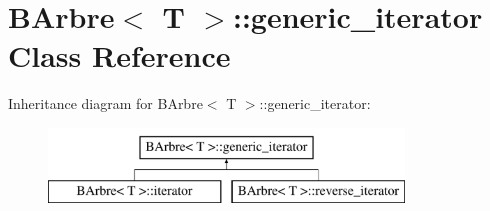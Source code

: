 \hypertarget{classBArbre_1_1generic__iterator}{
\section{BArbre$<$ T $>$::generic\_\-iterator Class Reference}
\label{classBArbre_1_1generic__iterator}
}
Inheritance diagram for BArbre$<$ T $>$::generic\_\-iterator:\begin{figure}[H]
\begin{center}
\leavevmode
\includegraphics[height=2.000000cm]{classBArbre_1_1generic__iterator}
\end{center}
\end{figure}

